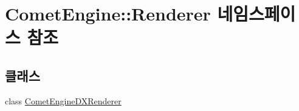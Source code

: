 \hypertarget{namespace_comet_engine_1_1_renderer}{}\section{Comet\+Engine\+:\+:Renderer 네임스페이스 참조}
\label{namespace_comet_engine_1_1_renderer}
\subsection*{클래스}
\begin{DoxyCompactItemize}
\item 
class \hyperlink{class_comet_engine_1_1_renderer_1_1_comet_engine_d_x_renderer}{Comet\+Engine\+D\+X\+Renderer}
\end{DoxyCompactItemize}
